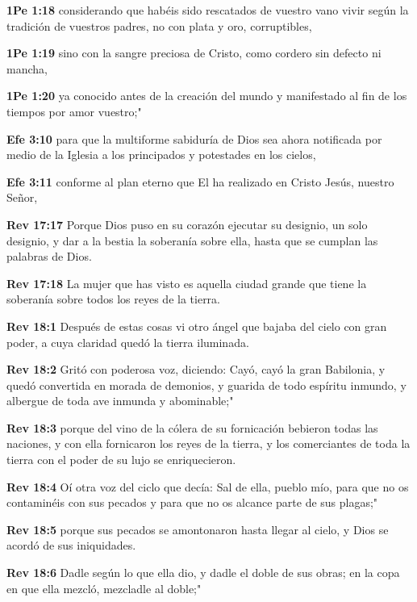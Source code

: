 \blSetBookNameMeaning{}
\blStartBook



\textbf{1Pe 1:18} considerando que habéis sido rescatados de vuestro vano vivir según la tradición de vuestros padres, no con plata y oro, corruptibles, 

\textbf{1Pe 1:19} sino con la sangre preciosa de Cristo, como cordero sin defecto ni mancha, 

\textbf{1Pe 1:20} ya conocido antes de la creación del mundo y manifestado al fin de los tiempos por amor vuestro;" 

\textbf{Efe 3:10} para que la multiforme sabiduría de Dios sea ahora notificada por medio de la Iglesia a los principados y potestades en los cielos, 

\textbf{Efe 3:11} conforme al plan eterno que El ha realizado en Cristo Jesús, nuestro Señor, 


\textbf{Rev 17:17} Porque Dios puso en su corazón ejecutar su designio, un solo designio, y dar a la bestia la soberanía sobre ella, hasta que se cumplan las palabras de Dios. 

\textbf{Rev 17:18} La mujer que has visto es aquella ciudad grande que tiene la soberanía sobre todos los reyes de la tierra. 

\textbf{Rev 18:1} Después de estas cosas vi otro ángel que bajaba del cielo con gran poder, a cuya claridad quedó la tierra iluminada. 

\textbf{Rev 18:2} Gritó con poderosa voz, diciendo: Cayó, cayó la gran Babilonia, y quedó convertida en morada de demonios, y guarida de todo espíritu inmundo, y albergue de toda ave inmunda y abominable;" 

\textbf{Rev 18:3} porque del vino de la cólera de su fornicación bebieron todas las naciones, y con ella fornicaron los reyes de la tierra, y los comerciantes de toda la tierra con el poder de su lujo se enriquecieron. 

\textbf{Rev 18:4} Oí otra voz del ciclo que decía: Sal de ella, pueblo mío, para que no os contaminéis con sus pecados y para que no os alcance parte de sus plagas;" 

\textbf{Rev 18:5} porque sus pecados se amontonaron hasta llegar al cielo, y Dios se acordó de sus iniquidades. 

\textbf{Rev 18:6} Dadle según lo que ella dio, y dadle el doble de sus obras; en la copa en que ella mezcló, mezcladle al doble;" 

